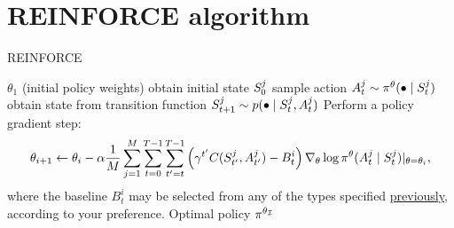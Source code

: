 \documentclass[12pt,twoside]{../../mitthesis}
\begin{document}
\section*{REINFORCE algorithm}
\begin{algorithm}
    \caption{REINFORCE}
    \label{alg:my-alg}
    \begin{algorithmic}
     $\theta_1$ (initial policy weights)
            \STATE obtain initial state $S_0^{j}$
                \STATE sample action $A_t^j \sim \pi^{\theta}(\bullet \mid S_t^{j})$
                \STATE obtain state from transition function $S_{t+1}^j \sim p(\bullet \mid S_t^j, A_t^j)$
            \ENDFOR
        \ENDFOR
        \STATE  Perform a policy gradient step:
        $$
            \theta_{i+1} \leftarrow \theta_i - \alpha \frac{1}{M}\sum_{j = 1}^M \sum_{t = 0}^{T-1}\sum_{t'=t}^{T-1}\left( \gamma^{t'} C(S_{t'}^j, A_{t'}^j) - B_{t}^i\right) \nabla_{\theta}\log \pi^{\theta}(A_t^j \mid S_t^j)\rvert_{\theta = \theta_i},
        $$
        \STATE where the baseline $B_t^i$ may be selected from any of the types specified \hyperlink{baseline-and-do-not-let-the-past-distract-you-principle}{previously}, according to your preference.
    \ENDFOR
    \STATE \RETURN Optimal policy $\pi^{\theta_{\mathcal I}}$
    \end{algorithmic}
\end{algorithm}
\end{document}
